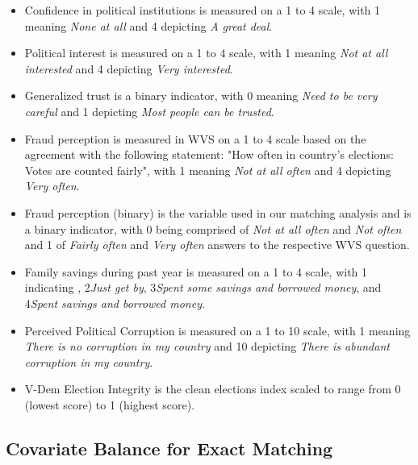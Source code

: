 \documentclass[11pt, ngerman,english,a4]{article}
\begin{document}
\begin{itemize}
    \item Confidence in political institutions is measured on a 1 to 4 scale, with 1 meaning \textit{None at all} and 4 depicting \textit{A great deal}.
    \item Political interest is measured on a 1 to 4 scale, with 1 meaning \textit{Not at all interested} and 4 depicting \textit{Very interested}.
    \item Generalized trust is a binary indicator, with 0 meaning \textit{Need to be very careful} and 1 depicting \textit{Most people can be trusted}.
    \item Fraud perception is measured in WVS on a 1 to 4 scale based on the agreement with the following statement: "How often in country's elections: Votes are counted fairly", with 1 meaning \textit{Not at all often} and 4 depicting \textit{Very often}. 
    \item Fraud perception (binary) is the variable used in our matching analysis and is a binary indicator, with 0 being comprised of \textit{Not at all often} and \textit{Not often} and 1 of \textit{Fairly often} and \textit{Very often} answers to the respective WVS question. 
    \item Family savings during past year is measured on a 1 to 4 scale, with 1 indicating , 2\textemdash\textit{Just get by}, 3\textemdash\textit{Spent some savings and borrowed money}, and 4\textemdash\textit{Spent savings and borrowed money}.  
    \item Perceived Political Corruption is measured on a 1 to 10 scale, with 1 meaning \textit{There is no corruption in my country} and 10 depicting \textit{There is abundant corruption in my country}.
    \item V-Dem Election Integrity is the clean elections index scaled to range from 0 (lowest score) to 1 (highest score).

\end{itemize}


\subsection{Covariate Balance for Exact Matching}
\end{document}
